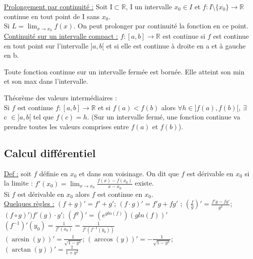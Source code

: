\documentclass[../main.tex]{subfiles}
\begin{document}
\quad \underline{Prolongement par continuité :} Soit I$\subset \mathbb{R}$, I un intervalle $x_0 \in I$ et $f : I\setminus \{x_0\} \rightarrow \mathbb{R}$ continue en tout point de I sans $x_0$. \\
Si $L = \lim_{x\rightarrow x_0} f(x)$. On peut prolonger par continuité la fonction en ce point.\\

\quad \underline{Continuité sur un intervalle compact :} $f:[a,b]\rightarrow \mathbb{R}$ est continue si $f$ est continue en tout point sur l'intervalle $]a,b[$ et si elle est continue à droite en a et à gauche en b.\\

\begin{theorem}
    Toute fonction continue sur un intervalle fermée est bornée. Elle atteint son min et son max dans l'intervalle. 
\end{theorem}

\begin{theorem}
    Théorème des valeurs intermédiaires :\\
    Si $f$ est continue $f:[a,b] \rightarrow \mathbb{R}$ et si $f(a) < f(b)$ alors $\forall h \in ]f(a), f(b)[$, $\exists$ c $\in ]a,b[$ tel que $f(c) = h$. (Sur un intervalle fermé, une fonction continue va prendre toutes les valeurs comprises entre $f(a)$ et $f(b)$).
\end{theorem}

\subsection{Calcul différentiel}
\underline{Def :} soit $f$ définie en $x_0$ et dans son voisinage. On dit que $f$ est dérivable en $x_0$ si la limite : $f'(x_0) = \lim_{x\rightarrow x_0} \frac{f(x) - f(x_0)}{x-x_0}$ existe. \\

Si $f$ est dérivable en $x_0$ alors $f$ est continue en $x_0$.\\

\underline{Quelques règles :} $(f+g)' = f'+g'$;
$(f\cdot g)' = f'g + fg'$ ; $(\frac{f}{g})' = \frac{f'g - fg'}{g^2}$; $(f\circ g)' ) f'(g)\cdot g'$; $(f^g)' = (e^{gln(f)})(g ln(f))'$\\
$(f^{-1})'(y_0) = \frac{1}{f'(x_0)} = \frac{1}{f'(f^{-1}(y_0))}$\\

$(\arcsin(y))' = \frac{1}{\sqrt{1-y^2}}$; $(\arccos(y))' = -\frac{1}{\sqrt{1-y^2}}$; $(\arctan(y))' = \frac{1}{1+y^2}$\\
\end{document}
